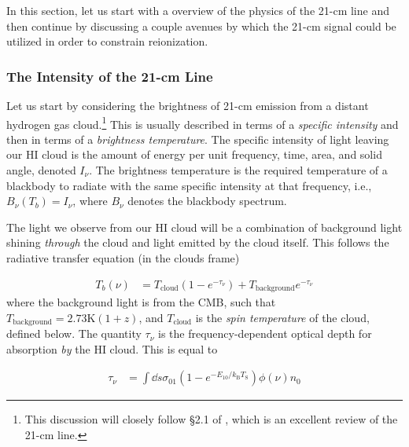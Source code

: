 In this section, let us start with a overview of the physics of the 21-cm line and then continue by discussing a couple avenues by which the 21-cm signal could be utilized in order to constrain reionization. 


\subsubsection{The Intensity of the 21-cm Line}\label{sec:21cmPhysics}


Let us start by considering the brightness of 21-cm emission from a distant hydrogen gas cloud.\footnote{This discussion will closely follow \S 2.1 of \citealt{Furlanetto2006}, which is an excellent review of the 21-cm line.} This is usually described in terms of a \textit{specific intensity} and then in terms of a \textit{brightness temperature}. The specific intensity of light leaving our HI cloud is the amount of energy per unit frequency, time, area, and solid angle, denoted $I_{\nu}$. The brightness temperature is the required temperature of a blackbody to radiate with the same specific intensity at that frequency, i.e., $B_{\nu}(T_b) = I_{\nu}$, where $B_{\nu}$ denotes the blackbody spectrum. 


The light we observe from our HI cloud will be a combination of background light shining \textit{through} the cloud and light emitted by the cloud itself. This follows the radiative transfer equation (in the clouds frame)

\begin{align}
T_b(\nu) &= T_{\text{cloud}}(1-e^{-\tau_{\nu}}) + T_{\text{background}}e^{-\tau_{\nu}} \label{eq:cloudframe}
\end{align}
where the background light is from the CMB, such that $T_{\text{background}} = 2.73\text{K}(1+z)$, and $T_{\text{cloud}}$ is the \textit{spin temperature} of the cloud, defined below. The quantity $\tau_{\nu}$ is the frequency-dependent optical depth for absorption \textit{by} the HI cloud. This is equal to 

\begin{align}
\tau_{\nu} &= \int \dd s \sigma_{01}\left( 1 - e^{-E_{10}/k_{\text{B}}T_{\text{S}}} \right) \phi(\nu) n_{0} \label{eq:tau21}
\end{align}

